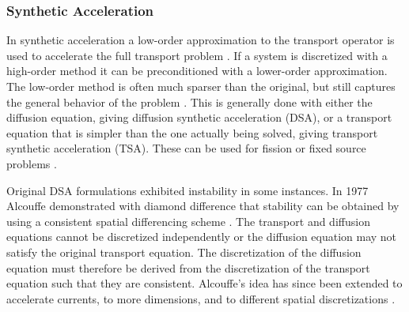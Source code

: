 \subsubsection{Synthetic Acceleration}
In synthetic acceleration a low-order approximation to the transport operator is used to accelerate the full transport problem \cite{Lewis1993}. If a system is discretized with a high-order method it can be preconditioned with a lower-order approximation. The low-order method is often much sparser than the original, but still captures the general behavior of the problem \cite{Trefethen1997}. This is generally done with either the diffusion equation, giving diffusion synthetic acceleration (DSA), or a transport equation  that is simpler than the one actually being solved, giving transport synthetic acceleration (TSA). These can be used for fission or fixed source problems \cite{Adams2002}. 


Original DSA formulations exhibited instability in some instances. In 1977 Alcouffe demonstrated with diamond difference that stability can be obtained by using a consistent spatial differencing scheme \cite{Alcouffe1977}. The transport and diffusion equations cannot be discretized independently or the diffusion equation may not satisfy the original transport equation. The discretization of the diffusion equation must therefore be derived from the discretization of the transport equation such that they are consistent. Alcouffe's idea has since been extended to accelerate currents, to more dimensions, and to different spatial discretizations \cite{Larsen1982}. 

